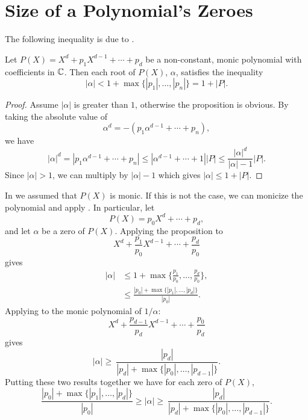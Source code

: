 \section{Size of a Polynomial's Zeroes}
\label{PB:RootSize:Sec}

The following inequality is due to {\Cauchy}
\cite{Cauchy1829-wp}.

\begin{proposition}[Cauchy]
\label{Cauchy:Zero:Bound:Prop}
Let $P(X) = X^{d} + p_{1} X^{d-1} + \cdots + p_{d}$ be a non-constant,
monic polynomial with coefficients in $\mathbb{C}$.  Then each root of $P(X)$,
$\alpha$, satisfies the inequality
\begin{equation}
\label{Cauchy:Zero:Ineq:Eq}
\left|\alpha\right| < 1 + \max \{|p_{1}|, \ldots, |p_{n}|\} 
  = 1 + \left| P \right|.
\end{equation}
\end{proposition}

\begin{proof}
Assume $|\alpha|$ is greater than $1$, otherwise the proposition is obvious.
By taking the absolute value of 
\[
\alpha^d = -(p_{1} \alpha^{d-1} + \cdots + p_{n}),
\]
we have
\[
\left| \alpha \right|^{d} = \left| p_{1} \alpha^{d-1} + \cdots + p_{n} \right|
 \le \left| \alpha^{d-1} + \cdots + 1 \right| |P| 
 \le \frac{|\alpha|^{d}}{|\alpha| - 1} |P|.
\]
Since $|\alpha| > 1$, we can multiply by $|\alpha| - 1$ which gives 
$|\alpha| \le 1 + |P|$. 
\end{proof}

In  we assumed that $P(X)$ is monic.  If this is not the case, we
can monicize the polynomial and apply .  In
particular, let 
\[
P(X) = p_{0} X^{d} + \cdots + p_{d},
\]
and let $\alpha$ be a zero of $P(X)$.  Applying the proposition to
\[
X^{d} + \frac{p_{1}}{p_{0}}X^{d-1} + \cdots + \frac{p_{d}}{p_{0}}
\]
gives
\[
\begin{aligned}
|\alpha| & 
   \le 1 + \max\{ \frac{p_{1}}{p_{0}}, \ldots, \frac{p_{d}}{p_{0}} \},\\
 & \le \frac{\left|p_{0}\right| + 
               \max \{\left|p_{1}\right|, \ldots, \left|p_{d}\right|
\}}{\left|p_{0}\right|}.
\end{aligned}
\]
Applying  to the monic polynomial of
$1/\alpha$:
\[
X^{d} + \frac{p_{d-1}}{p_{d}} X^{d-1} + \cdots + \frac{p_{0}}{p_{d}}
\]
gives
\[
|\alpha| \ge \ \frac{\left|p_{d}\right|}{\left|p_{d}\right| + 
   \max\{ \left|p_{0}\right|, \ldots, \left|p_{d-1}\right|\}}.
\]
Putting these two results together we have for each zero of $P(X)$,
\[
\frac{\left|p_{0}\right| + 
               \max \{\left|p_{1}\right|, \ldots, \left|p_{d}\right|
\}}{\left|p_{0}\right|}
\ge
|\alpha| \ge \ \frac{\left|p_{d}\right|}{\left|p_{d}\right| + 
   \max\{ \left|p_{0}\right|, \ldots, \left|p_{d-1}\right|\}}.
\]

